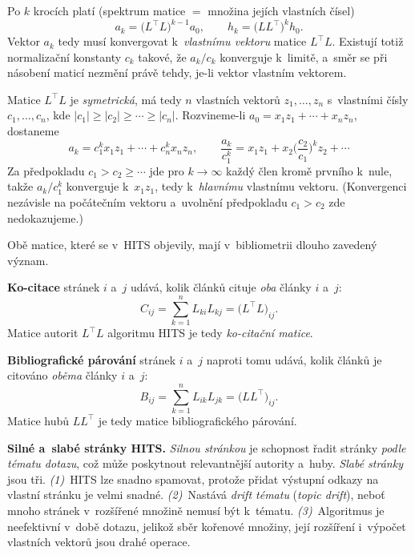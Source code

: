\documentclass[11pt,a4paper]{article}
\theoremstyle{definition}
\begin{document}
\begin{defbox}
Po $k$ krocích platí (spektrum matice $=$ množina jejích vlastních čísel)
\[ a_k=\big(L^{\!\top}L\big)^{k-1}a_0,\qquad h_k=\big(LL^{\!\top}\big)^{k}h_0. \]
Vektor $a_k$ tedy musí konvergovat k~\emph{vlastnímu vektoru} matice $L^{\!\top}L$. Existují
totiž normalizační konstanty $c_k$ takové, že $a_k/c_k$ konverguje k~limitě, a~směr se při
násobení maticí nezmění právě tehdy, je-li vektor vlastním vektorem.

Matice $L^{\!\top}L$ je \emph{symetrická}, má tedy $n$ vlastních vektorů $z_1,\dots,z_n$
s~vlastními čísly $c_1,\dots,c_n$, kde $|c_1|\ge|c_2|\ge\cdots\ge|c_n|$. Rozvineme-li
$a_0=x_1z_1+\cdots+x_nz_n$, dostaneme
\[ a_k=c_1^{k}x_1z_1+\cdots+c_n^{k}x_nz_n,\qquad
   \frac{a_k}{c_1^{k}}=x_1z_1+x_2\Big(\frac{c_2}{c_1}\Big)^{\!k}z_2+\cdots \]
Za předpokladu $c_1>c_2\ge\cdots$ jde pro $k\to\infty$ každý člen kromě prvního k~nule, takže
$a_k/c_1^k$ konverguje k~$x_1z_1$, tedy k~\emph{hlavnímu} vlastnímu vektoru. (Konvergenci
nezávisle na počátečním vektoru a~uvolnění předpokladu $c_1>c_2$ zde nedokazujeme.)
\end{defbox}

Obě matice, které se v~HITS objevily, mají v~bibliometrii dlouho zavedený význam.

\begin{defbox}
\textbf{Ko-citace} stránek $i$ a~$j$ udává, kolik článků cituje \emph{oba} články $i$ a~$j$:
\[ C_{ij}=\sum_{k=1}^{n}L_{ki}L_{kj}=\big(L^{\!\top}L\big)_{ij}. \]
Matice autorit $L^{\!\top}L$ algoritmu HITS je tedy \emph{ko-citační matice}.

\textbf{Bibliografické párování} stránek $i$ a~$j$ naproti tomu udává, kolik článků je citováno
\emph{oběma} články $i$ a~$j$:
\[ B_{ij}=\sum_{k=1}^{n}L_{ik}L_{jk}=\big(LL^{\!\top}\big)_{ij}. \]
Matice hubů $LL^{\!\top}$ je tedy matice bibliografického párování.
\end{defbox}

\textbf{Silné a~slabé stránky HITS.} \emph{Silnou stránkou} je schopnost řadit stránky
\emph{podle tématu dotazu}, což může poskytnout relevantnější autority a~huby. \emph{Slabé
stránky} jsou tři. \emph{(1)}~HITS lze snadno spamovat, protože přidat výstupní odkazy na
vlastní stránku je velmi snadné. \emph{(2)}~Nastává \emph{drift tématu} (\emph{topic drift}),
neboť mnoho stránek v~rozšířené množině nemusí být k~tématu. \emph{(3)}~Algoritmus je
neefektivní v~době dotazu, jelikož sběr kořenové množiny, její rozšíření i~výpočet vlastních
vektorů jsou drahé operace.
\end{document}
